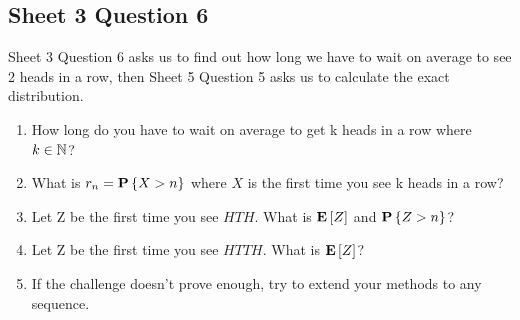 \documentclass{article}
\begin{document}
\subsection{Sheet 3 Question 6}
Sheet 3 Question 6 asks us to find out how long we have to wait on average to see 2 heads in a row, then Sheet 5 Question 5 asks us to calculate the exact distribution.
\begin{enumerate}
    \item How long do you have to wait on average to get k heads in a row where $k\in{\mathbb N}$?
    \item What is $r_n={\mathbf P}\left\{X>n\right\}$ where $X$ is the first time you see k heads in a row?
    \item Let Z be the first time you see $HTH$. What is ${\mathbf E}\left[Z\right]$ and ${\mathbf P}\left\{Z>n\right\}$?
    \item Let Z be the first time you see $HTTH$. What is ${\mathbf E}\left[Z\right]$?
    \item If the challenge doesn't prove enough, try to extend your methods to any sequence.
\end{enumerate}
\end{document}
